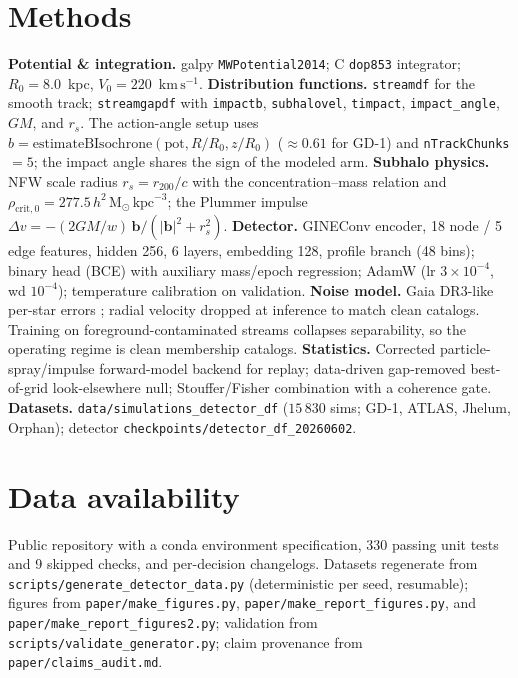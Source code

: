 \documentclass[fleqn,usenatbib]{mnras}
\newcommand{\msun}{\ensuremath{\mathrm{M}_\odot}}
\newcommand{\kms}{\ensuremath{\mathrm{km\,s^{-1}}}}
\newcommand{\code}[1]{\texttt{#1}}
\begin{document}
\section*{Methods}
\textbf{Potential \& integration.} galpy \code{MWPotential2014}; C \code{dop853}
integrator; $R_0=8.0$~kpc, $V_0=220$~\kms.
\textbf{Distribution functions.} \code{streamdf} \citep{Bovy2014streamdf} for the
smooth track; \code{streamgapdf} \citep{SandersBovyErkal2016} with \code{impactb},
\code{subhalovel}, \code{timpact}, \code{impact\_angle}, $GM$, and $r_s$. The
action-angle setup uses $b=\mathrm{estimateBIsochrone}(\mathrm{pot},R/R_0,z/R_0)$
(${\approx}0.61$ for GD-1) and \code{nTrackChunks}$=5$; the impact angle shares the sign
of the modeled arm. \textbf{Subhalo physics.} NFW scale radius $r_s=r_{200}/c$ with the
\citet{Ludlow2016} concentration--mass relation and
$\rho_\mathrm{crit,0}=277.5\,h^2\,\msun\,\mathrm{kpc}^{-3}$; the
\citet{ErkalBelokurov2015} Plummer impulse
$\Delta v=-(2GM/w)\,\mathbf{b}/(|\mathbf{b}|^2+r_s^2)$. \textbf{Detector.} GINEConv
encoder, 18 node / 5 edge features, hidden 256, 6 layers, embedding 128, profile branch
(48 bins); binary head (BCE) with auxiliary mass/epoch regression; AdamW
(lr $3\times10^{-4}$, wd $10^{-4}$); temperature calibration on validation.
\textbf{Noise model.} Gaia DR3-like per-star errors \citep[][scale $0.5$--$2\times$]
{GaiaDR3}; radial velocity dropped at inference to match clean catalogs. Training on
foreground-contaminated streams collapses separability, so the operating regime is
clean membership catalogs. \textbf{Statistics.} Corrected particle-spray/impulse
forward-model backend for replay; data-driven gap-removed best-of-grid look-elsewhere
null; Stouffer/Fisher combination with a coherence gate. \textbf{Datasets.}
\code{data/simulations\_detector\_df} ($15\,830$
sims; GD-1, ATLAS, Jhelum, Orphan); detector \code{checkpoints/detector\_df\_20260602}.

\section*{Data availability}
Public repository with a conda environment specification, 330 passing unit tests and 9 skipped checks, and
per-decision changelogs. Datasets regenerate from
\code{scripts/generate\_detector\_data.py} (deterministic per seed, resumable); figures
from \code{paper/make\_figures.py}, \code{paper/make\_report\_figures.py}, and
\code{paper/make\_report\_figures2.py}; validation from
\code{scripts/validate\_generator.py}; claim provenance from
\code{paper/claims\_audit.md}.




\label{lastpage}
\end{document}
